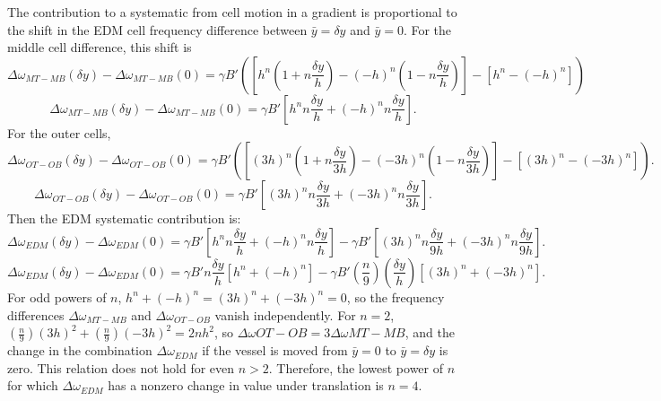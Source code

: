 \documentclass [10pt, twoside] {uwthesis}[2012/04/02]
\begin{document}
The contribution to a systematic from cell motion in a gradient is proportional to the shift in the EDM cell frequency difference between $\bar{y} = \delta y$ and $\bar{y} = 0$. For the middle cell difference, this shift is
\begin{equation}
\Delta\omega_{MT-MB}(\delta y) - \Delta\omega_{MT-MB}(0) = \gamma B'([h^n(1+n\frac{\delta y}{h}) - (-h)^n(1-n\frac{\delta y}{h})] - [h^n-(-h)^n])
\end{equation}
\begin{equation}
\Delta\omega_{MT-MB}(\delta y) - \Delta\omega_{MT-MB}(0) = \gamma B'[h^n n\frac{\delta y}{h} + (-h)^n n\frac{\delta y}{h}].
\end{equation}
For the outer cells,
\begin{equation}
\Delta\omega_{OT-OB}(\delta y) - \Delta\omega_{OT-OB}(0) = \gamma B'([(3h)^n(1+n\frac{\delta y}{3h}) - (-3h)^n(1-n\frac{\delta y}{3h})] - [(3h)^n-(-3h)^n]).
\end{equation}
\begin{equation}
\Delta\omega_{OT-OB}(\delta y) - \Delta\omega_{OT-OB}(0) = \gamma B'[(3h)^n n\frac{\delta y}{3h} + (-3h)^n n\frac{\delta y}{3h}].
\end{equation}
Then the EDM systematic contribution is:
\begin{equation}
\Delta\omega_{EDM}(\delta y) - \Delta\omega_{EDM}(0) = \gamma B'[h^n n\frac{\delta y}{h} + (-h)^n n\frac{\delta y}{h}] - \gamma B'[(3h)^n n\frac{\delta y}{9h} + (-3h)^n n\frac{\delta y}{9h}].
\end{equation}
\begin{equation}
\Delta\omega_{EDM}(\delta y) - \Delta\omega_{EDM}(0) = \gamma B' n\frac{\delta y}{h}[h^n + (-h)^n] - \gamma B'(\frac{n}{9})(\frac{\delta y}{h})[(3h)^n + (-3h)^n].
\end{equation}
For odd powers of $n$, $h^n + (-h)^n = (3h)^n + (-3h)^n = 0$, so the frequency differences $\Delta\omega_{MT-MB}$ and $\Delta\omega_{OT-OB}$ vanish independently. For $n=2$, $(\frac{n}{9})(3h)^2 + (\frac{n}{9})(-3h)^2 = 2nh^2$, so $\Delta\omega{OT-OB} = 3\Delta\omega{MT-MB}$, and the change in the combination $\Delta\omega_{EDM}$ if the vessel is moved from $\bar{y}=0$ to $\bar{y} = \delta y$ is zero. This relation does not hold for even $n>2$. Therefore, the lowest power of $n$ for which $\Delta\omega_{EDM}$ has a nonzero change in value under translation is $n=4$.
\end{document}
